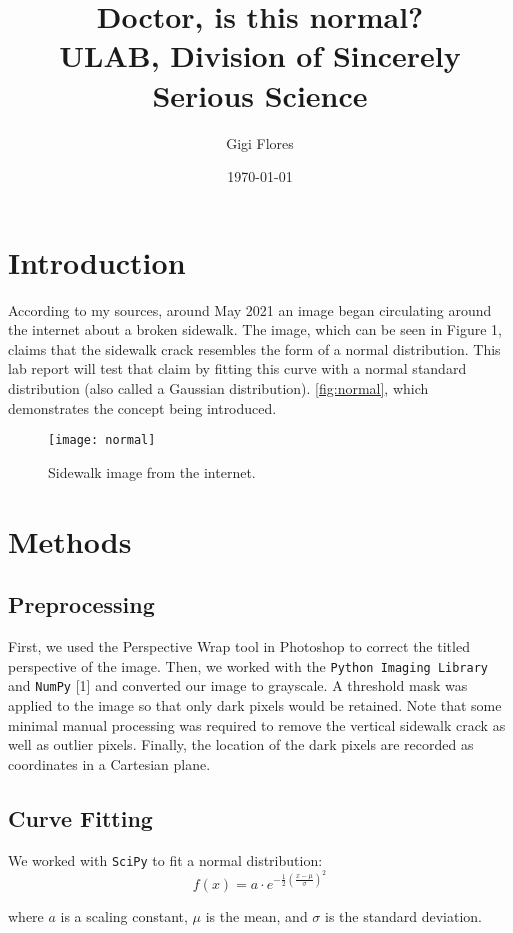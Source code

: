 \documentclass{article}
\title{Doctor, is this normal?\\ \large ULAB, Division of Sincerely Serious Science}
\author{Gigi Flores}
\date{\today}
\begin{document}
\maketitle

\section{Introduction}
According to my sources, around May 2021 an image began circulating around the internet about a broken sidewalk. The image, which can be seen in Figure 1, claims that the sidewalk crack resembles the form of a normal distribution. This lab report will test that claim by fitting this curve with a normal standard distribution (also called a Gaussian distribution). \autoref{fig:normal}, which demonstrates the concept being introduced.


\begin{figure}[h]
    \centering
    \texttt{[image: normal]} 
    \caption{Sidewalk image from the internet.}
    \label{fig:normal} 
    
\end{figure}

\section{Methods}
\subsection{Preprocessing}
First, we used the Perspective Wrap tool in Photoshop to correct the titled perspective of the image. Then, we worked with the \texttt{Python Imaging Library} and \texttt{NumPy} [1] and converted our image to grayscale.
A threshold mask was applied to the image so that only dark pixels would be retained. Note that some minimal manual processing was required to remove the vertical sidewalk crack as well as outlier pixels.
Finally, the location of the dark pixels are recorded as coordinates in a Cartesian plane.

\subsection{Curve Fitting}
We worked with \texttt{SciPy} to fit a normal distribution:
\begin{equation}
f(x)=a\cdot e^{-\frac{1}{2} \left( \frac{x - \mu}{\sigma} \right)^2}
\end{equation}

where \(a\) is a scaling constant, \(\mu\) is the mean, and \(\sigma\) is the standard deviation.
\end{document}
